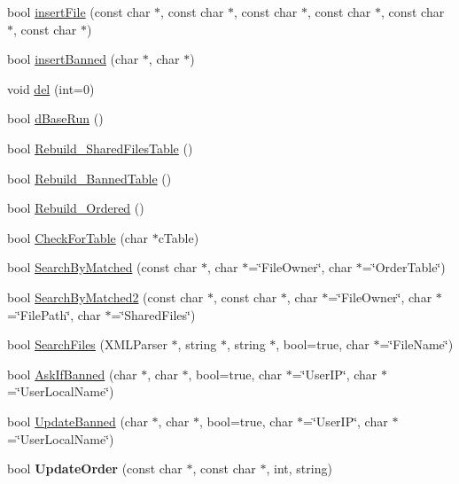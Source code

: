 \begin{DoxyCompactItemize}
\item 
bool \hyperlink{classdBase_ac5b1d43710622a869134a0f7504f6661}{insertFile} (const char $\ast$, const char $\ast$, const char $\ast$, const char $\ast$, const char $\ast$, const char $\ast$)
\item 
bool \hyperlink{classdBase_a26e59ac97985d95287948445a07acd71}{insertBanned} (char $\ast$, char $\ast$)
\item 
void \hyperlink{classdBase_ae3f64548cd601248838741b7704a0884}{del} (int=0)
\item 
bool \hyperlink{classdBase_aea02faef6ec0330213d2d5e6e7449940}{dBaseRun} ()
\item 
bool \hyperlink{classdBase_a9e9715965ba80d3c7a9c401d62a43f6a}{Rebuild\_\-SharedFilesTable} ()
\item 
bool \hyperlink{classdBase_a05d94436a22bf5e3c52c1ab0f67c2d4c}{Rebuild\_\-BannedTable} ()
\item 
bool \hyperlink{classdBase_a7a5431d74f4b1f7b201c25b7d3a52ffa}{Rebuild\_\-Ordered} ()
\item 
bool \hyperlink{classdBase_a8dcd257825f5b4543cf07b766b0e6cd8}{CheckForTable} (char $\ast$cTable)
\item 
bool \hyperlink{classdBase_a91269d6744d42078ac8880d32e3a1229}{SearchByMatched} (const char $\ast$, char $\ast$=\char`\"{}FileOwner\char`\"{}, char $\ast$=\char`\"{}OrderTable\char`\"{})
\item 
bool \hyperlink{classdBase_aa6aba86beb506496929ea8ff8aef8245}{SearchByMatched2} (const char $\ast$, const char $\ast$, char $\ast$=\char`\"{}FileOwner\char`\"{}, char $\ast$=\char`\"{}FilePath\char`\"{}, char $\ast$=\char`\"{}SharedFiles\char`\"{})
\item 
bool \hyperlink{classdBase_a568417f1966cdad5e64f553a96ef201b}{SearchFiles} (XMLParser $\ast$, string $\ast$, string $\ast$, bool=true, char $\ast$=\char`\"{}FileName\char`\"{})
\item 
bool \hyperlink{classdBase_a9afd72b6a6dbb29f0ae100d5f04cc119}{AskIfBanned} (char $\ast$, char $\ast$, bool=true, char $\ast$=\char`\"{}UserIP\char`\"{}, char $\ast$=\char`\"{}UserLocalName\char`\"{})
\item 
bool \hyperlink{classdBase_ae4b52702ff5312ee8a21b13552c67f7f}{UpdateBanned} (char $\ast$, char $\ast$, bool=true, char $\ast$=\char`\"{}UserIP\char`\"{}, char $\ast$=\char`\"{}UserLocalName\char`\"{})
\item 
\hypertarget{classdBase_aa4e6053dc3789225d7ce404ad77c5d0d}{
bool {\bfseries UpdateOrder} (const char $\ast$, const char $\ast$, int, string)}
\label{classdBase_aa4e6053dc3789225d7ce404ad77c5d0d}


\end{DoxyCompactItemize}
